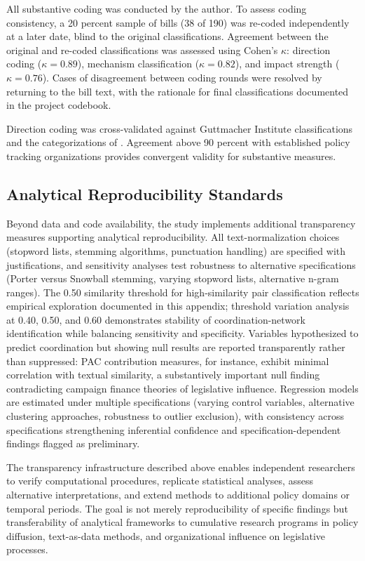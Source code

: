 \documentclass[12pt]{report}
\begin{document}
All substantive coding was conducted by the author. To assess coding consistency, a 20
percent sample of bills (38 of 190) was re-coded independently at a later date, blind to
the original classifications. Agreement between the original and re-coded classifications
was assessed using Cohen's $\kappa$: direction coding ($\kappa = 0.89$), mechanism
classification ($\kappa = 0.82$), and impact strength ($\kappa = 0.76$). Cases of
disagreement between coding rounds were resolved by returning to the bill text, with the
rationale for final classifications documented in the project codebook.

Direction coding was cross-validated against Guttmacher Institute classifications and
the categorizations of \textcite{nash13StatesHave2022}. Agreement above 90 percent with
established policy tracking organizations provides convergent validity for substantive
measures.

\subsection{Analytical Reproducibility Standards}
Beyond data and code availability, the study implements additional transparency
measures supporting analytical reproducibility. All text-normalization choices
(stopword lists, stemming algorithms, punctuation handling) are specified with
justifications, and sensitivity analyses test robustness to alternative specifications
(Porter versus Snowball stemming, varying stopword lists, alternative n-gram ranges).
The 0.50 similarity threshold for high-similarity pair classification reflects empirical
exploration documented in this appendix; threshold variation analysis at 0.40, 0.50, and
0.60 demonstrates stability of coordination-network identification while balancing
sensitivity and specificity. Variables hypothesized to predict coordination but showing
null results are reported transparently rather than suppressed: PAC contribution
measures, for instance, exhibit minimal correlation with textual similarity, a
substantively important null finding contradicting campaign finance theories of
legislative influence. Regression models are estimated under multiple specifications
(varying control variables, alternative clustering approaches, robustness to outlier
exclusion), with consistency across specifications strengthening inferential confidence
and specification-dependent findings flagged as preliminary.

The transparency infrastructure described above enables independent researchers to
verify computational procedures, replicate statistical analyses, assess alternative
interpretations, and extend methods to additional policy domains or temporal periods.
The goal is not merely reproducibility of specific findings but transferability of
analytical frameworks to cumulative research programs in policy diffusion, text-as-data
methods, and organizational influence on legislative processes.
\end{document}
